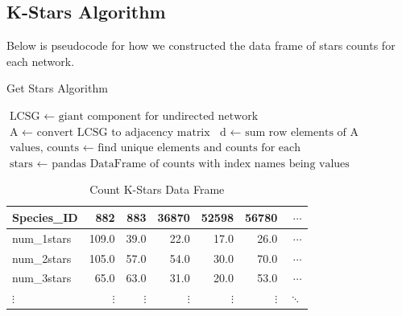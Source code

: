 \documentclass[12pt]{article}
\begin{document}
\subsection{K-Stars Algorithm}
Below is pseudocode for how we constructed the data frame of stars counts for each network.
\begin{algorithm}
\caption{Get Stars Algorithm}\label{alg:cap}
\begin{algorithmic}
\State $\text{LCSG } \gets \text{ giant component for undirected network}$
\State $\text{A } \gets \text{ convert LCSG to adjacency matrix}$
\State $\text{d } \gets \text{ sum row elements of A}$
\State $\text{values, counts } \gets \text{ find unique elements and counts for each}$
\State $\text{stars } \gets \text{ pandas DataFrame of counts with index names being values}$
\end{algorithmic}
\end{algorithm}
\begin{table}[H]
\centering
\caption{Count K-Stars Data Frame}
\begin{tabular}{lrrrrrr}
\toprule
Species\_ID &  882   &  883   &  36870 &  52598 &  56780 & $\cdots$\\
\midrule
num\_1stars &  109.0 &   39.0 &   22.0 &   17.0 &   26.0 & $\cdots$\\
num\_2stars &  105.0 &   57.0 &   54.0 &   30.0 &   70.0 & $\cdots$\\
num\_3stars &   65.0 &   63.0 &   31.0 &   20.0 &   53.0 & $\cdots$\\
$\vdots$ &   $\vdots$ &   $\vdots$ &   $\vdots$ &    $\vdots$ &   $\vdots$ & $\ddots$\\
\bottomrule
\end{tabular}
\end{table}
\end{document}
